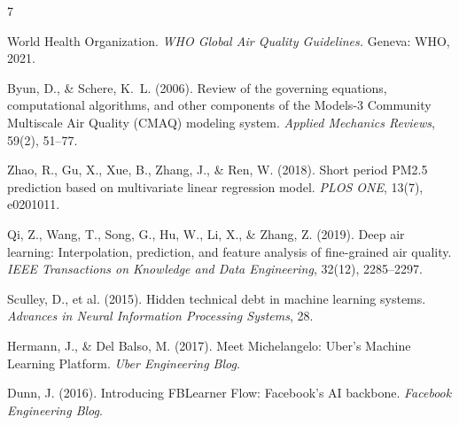 \documentclass[sigconf, nonacm]{acmart}
\begin{document}
\begin{thebibliography}{7}

World Health Organization.
\textit{WHO Global Air Quality Guidelines.}
Geneva: WHO, 2021.

Byun, D., \& Schere, K.~L. (2006).
Review of the governing equations, computational algorithms,
and other components of the Models-3 Community Multiscale
Air Quality (CMAQ) modeling system.
\textit{Applied Mechanics Reviews}, 59(2), 51--77.

Zhao, R., Gu, X., Xue, B., Zhang, J., \& Ren, W. (2018).
Short period PM2.5 prediction based on multivariate linear
regression model.
\textit{PLOS ONE}, 13(7), e0201011.

Qi, Z., Wang, T., Song, G., Hu, W., Li, X., \& Zhang, Z.
(2019).
Deep air learning: Interpolation, prediction, and feature
analysis of fine-grained air quality.
\textit{IEEE Transactions on Knowledge and Data
Engineering}, 32(12), 2285--2297.

Sculley, D., et al. (2015).
Hidden technical debt in machine learning systems.
\textit{Advances in Neural Information Processing
Systems}, 28.

Hermann, J., \& Del Balso, M. (2017).
Meet Michelangelo: Uber's Machine Learning Platform.
\textit{Uber Engineering Blog}.

Dunn, J. (2016).
Introducing FBLearner Flow: Facebook's AI backbone.
\textit{Facebook Engineering Blog}.

\end{thebibliography}
\end{document}
